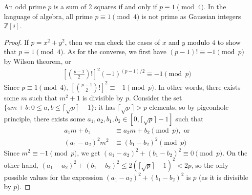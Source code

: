 \documentclass{treatise}
\begin{document}
\begin{shaded}
\begin{theorem}
An odd prime $p$ is a sum of 2 squares if and only if $p \equiv 1 \pmod{4}$. In the language of algebra, all prime $p \equiv 1 \pmod{4}$ is not prime as Gaussian integers $\mathbb{Z}[i]$.
\end{theorem}
\begin{proof}
If $p = x^2 + y^2$, then we can check the cases of $x$ and $y$ modulo $4$ to show that $p \equiv 1 \pmod{4}$. As for the converse, we first have $(p - 1)! \equiv -1 \pmod{p}$ by Wilson theorem, or
\begin{align*}
\left[ \left( \frac{p - 1}{2} \right)! \right]^2 (-1)^{(p - 1)/2} \equiv -1 \pmod{p}
\end{align*}
Since $p \equiv 1 \pmod{4}$, $\left[ \left( \frac{p - 1}{2} \right)! \right]^2 \equiv -1 \pmod{p}$. In other words, there exists some $m$ such that $m^2 + 1$ is divisible by $p$. Consider the set $\{ am + b : 0 \leq a, b \leq \lceil \sqrt{p} \rceil - 1 \}$: it has $\lceil \sqrt{p} \rceil > p$ elements, so by pigeonhole principle, there exists some $a_1, a_2, b_1, b_2 \in [0, \lceil \sqrt{p} \rceil - 1]$ such that
\begin{align*}
a_1 m + b_1 & \equiv a_2 m + b_2 \pmod{p}, \mbox{ or} \\
(a_1 - a_2)^2 m^2 & \equiv (b_1 - b_2)^2 \pmod{p}
\end{align*}
Since $m^2 \equiv -1 \pmod{p}$, we get $(a_1 - a_2)^2 + (b_1 - b_2)^2 \equiv 0 \pmod{p}$. On the other hand, $(a_1 - a_2)^2 + (b_1 - b_2)^2 \leq 2 ( \lceil \sqrt{p} \rceil - 1)^2 < 2p$, so the only possible values for the expression $(a_1 - a_2)^2 + (b_1 - b_2)^2$ is $p$ (as it is divisible by $p$).
\end{proof}
\end{shaded}
\end{document}
